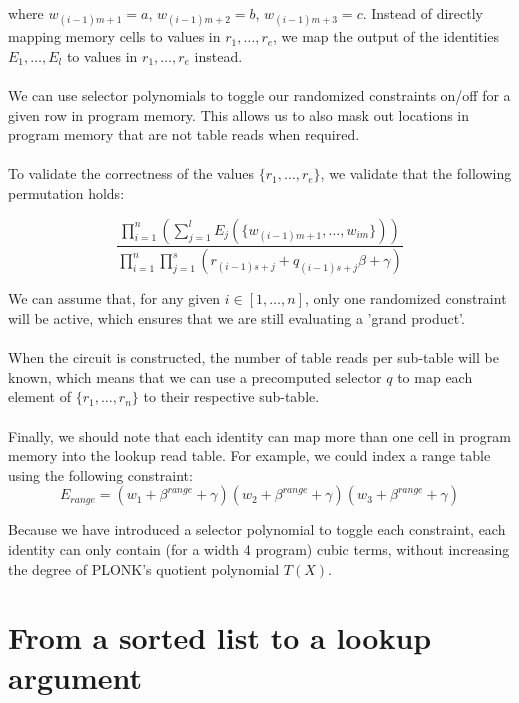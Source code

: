 \documentclass[11pt]{article} %
\begin{document}
where $w_{(i-1)m + 1} = a$, $w_{(i-1)m + 2} = b$, $w_{(i-1)m + 3} = c$. Instead of directly mapping memory cells to values in $r_1, \ldots, r_e$, we map the output of the identities $E_1, \ldots, E_l$ to values in $r_1, \ldots, r_e$ instead.
\\
\\
We can use selector polynomials to toggle our randomized constraints on/off for a given row in program memory. This allows us to also mask out locations in program memory that are not table reads when required.
\\
\\
To validate the correctness of the values $\{ r_1, \ldots, r_e \}$, we validate that the following permutation holds:

$$
\frac{\prod_{i=1}^n (\sum_{j=1}^l E_j(\{ w_{(i-1)m + 1}, \ldots, w_{im}\}))}
{\prod_{i=1}^n \prod_{j=1}^s (r_{(i-1)s + j} + q_{(i-1)s + j}\beta + \gamma)}
$$

We can assume that, for any given $i \in [1, \ldots, n]$, only one randomized constraint will be active, which ensures that we are still evaluating a 'grand product'.
\\
\\
When the circuit is constructed, the number of table reads per sub-table will be known, which means that we can use a precomputed selector $q$ to map each element of $\{r_1, \ldots, r_n \}$ to their respective sub-table.
\\
\\
Finally, we should note that each identity can map more than one cell in program memory into the lookup read table. For example, we could index a range table using the following constraint:
$$
E_{range} = (w_1 + \beta^{range} + \gamma)(w_2 + \beta^{range} + \gamma)(w_3 + \beta^{range} + \gamma)
$$

Because we have introduced a selector polynomial to toggle each constraint, each identity can only contain (for a width 4 program) cubic terms, without increasing the degree of PLONK's quotient polynomial $T(X)$.

\section{From a sorted list to a lookup argument}
\end{document}
